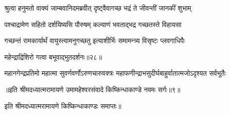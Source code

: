 \twolineshloka
{श्रुत्वा हनुमतो वाक्यं जाम्बवानिदमब्रवीत्}
{दृष्ट्वैवागच्छ भद्रं ते जीवन्तीं जानकीं शुभाम्} %

\twolineshloka
{पश्चाद्रामेण सहितो दर्शयिष्यसि पौरुषम्}
{कल्याणं भवताद्भद्र गच्छतस्ते विहायसा} %

\twolineshloka
{गच्छन्तं रामकार्यार्थं वायुस्त्वामनुगच्छतु}
{इत्याशीर्भिः समामन्त्र्य विसृष्टः प्लवगाधिपैः} %

{महेन्द्राद्रिशिरो गत्वा बभूवाद्भुतदर्शनः॥२८॥} %


\twolineshloka
{महानगेन्द्रप्रतिमो महात्मा सुवर्णवर्णोऽरुणचारुवक्त्रः}
{महाफणीन्द्राभसुदीर्घबाहुर्वातात्मजोऽदृश्यत सर्वभूतैः} %

{॥इति श्रीमदध्यात्मरामायणे उमामहेश्वरसंवादे किष्किन्धाकाण्डे
नवमः सर्गः॥९॥}

इति श्रीमदध्यात्मरामायणे किष्किन्धाकाण्डः समाप्तः॥